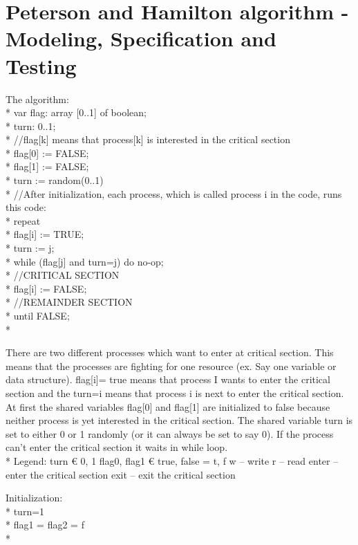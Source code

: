 \section{Peterson and Hamilton algorithm - Modeling,  Specification and Testing}
The algorithm:\\*
var flag: array [0..1] of boolean; \\*
turn: 0..1; \\*
//flag[k] means that process[k] is interested in the critical section \\*
flag[0] := FALSE; \\*
flag[1] := FALSE; \\*
turn := random(0..1) \\*
//After initialization, each process, which is called process i in the code, runs this code: \\*
repeat \\*
flag[i] := TRUE; \\*
turn := j; \\*
while (flag[j] and turn=j) do no-op; \\*
//CRITICAL SECTION \\*
flag[i] := FALSE; \\*
//REMAINDER SECTION \\*
until FALSE;\\*

There are two different processes which want to enter at critical section. 
This means that the processes are fighting for one resource (ex. Say one variable or data structure). 
flag[i]= true means that process I wants to enter the critical section and the turn=i means that process i is next to enter the critical section.
 At first the shared variables flag[0] and flag[1] are initialized to false because neither process is yet interested in the critical section. 
 The shared variable turn is set to either 0 or 1 randomly (or it can always be set to say 0). 
 If the process can’t enter the critical section it waits in while loop.
\\*
Legend:
turn € {0, 1}
flag0, flag1 € {true, false} = {t, f}
w – write
r – read
enter – enter the critical section
exit – exit the critical section

Initialization:\\*
turn=1\\*
flag1 = flag2 = f\\*

